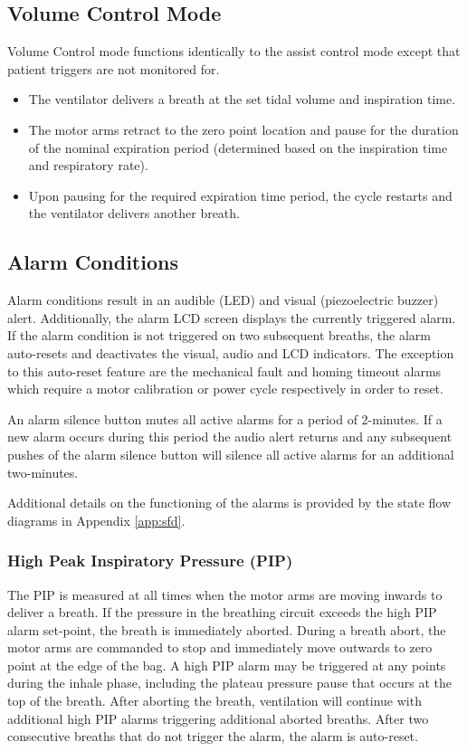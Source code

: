 \documentclass[]{article}
\begin{document}
\subsection{Volume Control Mode}
\label{sect:vcMode}
Volume Control mode functions identically to the assist control mode except that patient triggers are not monitored for.
\begin{itemize}
	\item The ventilator delivers a breath at the set tidal volume and inspiration time.
	\item The motor arms retract to the zero point location and pause for the duration of the nominal expiration period (determined based on the inspiration time and respiratory rate).
	\item Upon pausing for the required expiration time period, the cycle restarts and the ventilator delivers another breath.
\end{itemize}

\subsection{Alarm Conditions}

Alarm conditions result in an audible (LED) and visual (piezoelectric buzzer) alert. Additionally, the alarm LCD screen displays the currently triggered alarm.  If the alarm condition is not triggered on two subsequent breaths, the alarm auto-resets and deactivates the visual, audio and LCD indicators.  The exception to this auto-reset feature are the mechanical fault and homing timeout alarms which require a motor calibration or power cycle respectively in order to reset. 

An alarm silence button mutes all active alarms for a period of 2-minutes.  If a new alarm occurs during this period the audio alert returns and any subsequent pushes of the alarm silence button will silence all active alarms for an additional two-minutes.

Additional details on the functioning of the alarms is provided by the state flow diagrams in Appendix \ref{app:sfd}.

\subsubsection{High Peak Inspiratory Pressure (PIP)}
The PIP is measured at all times when the motor arms are moving inwards to deliver a breath.  If the pressure in the breathing circuit exceeds the high PIP alarm set-point, the breath is immediately aborted. During a breath abort, the motor arms are commanded to stop and immediately move outwards to zero point at the edge of the bag.  A high PIP alarm may be triggered at any points during the inhale phase, including the plateau pressure pause that occurs at the top of the breath.  After aborting the breath, ventilation will continue with additional high PIP alarms triggering additional aborted breaths.  After two consecutive breaths that do not trigger the alarm, the alarm is auto-reset.
\end{document}

